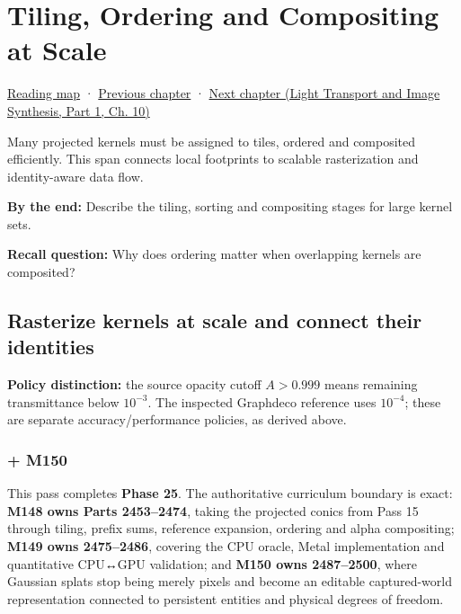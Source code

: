 \chapter{Tiling, Ordering and Compositing at Scale}\label{04-visual-computing-ii-ch039-tiling-ordering-and-compositing-at-scale}\hypertarget{04-visual-computing-ii-ch039}{}\label{stagechapter:04-visual-computing-ii-ch039}

\hypertarget{04-visual-computing-ii-ch039-tiling-ordering-and-compositing-at-scale}{}

\hyperref[volume-reading-map]{Reading map} · \hyperref[04-visual-computing-ii-ch038-projecting-ellipsoids-into-screen-space-conics]{Previous chapter} · \href{../04-Light-Transport-and-Image-Synthesis-P01/main.pdf\#nameddest=04-visual-computing-ii-ch040-lighting-reconstruction-and-surface-motion}{Next chapter (Light Transport and Image Synthesis, Part 1, Ch. 10)}

Many projected kernels must be assigned to tiles, ordered and composited efficiently. This span connects local footprints to scalable rasterization and identity-aware data flow.

\textbf{By the end:} Describe the tiling, sorting and compositing stages for large kernel sets.

\textbf{Recall question:} Why does ordering matter when overlapping kernels are composited?

\section{Rasterize kernels at scale and connect their identities}\label{04-visual-computing-ii-ch039-rasterize-kernels-at-scale-and-connect-their-identities}

\hypertarget{04-visual-computing-ii-ch039-rasterize-kernels-at-scale-and-connect-their-identities}{}

\textbf{Policy distinction:} the source opacity cutoff \(A>0.999\) means remaining transmittance below \(10^{-3}\). The inspected Graphdeco reference uses \(10^{-4}\); these are separate accuracy/performance policies, as derived above.

\subsection{+ M150}\label{04-visual-computing-ii-ch039-m150}

\hypertarget{04-visual-computing-ii-ch039-m150}{}

This pass completes \textbf{Phase 25}. The authoritative curriculum boundary is exact: \textbf{M148 owns Parts 2453--2474}, taking the projected conics from Pass 15 through tiling, prefix sums, reference expansion, ordering and alpha compositing; \textbf{M149 owns 2475--2486}, covering the CPU oracle, Metal implementation and quantitative CPU↔GPU validation; and \textbf{M150 owns 2487--2500}, where Gaussian splats stop being merely pixels and become an editable captured-world representation connected to persistent entities and physical degrees of freedom.

